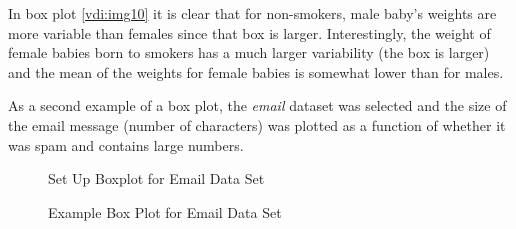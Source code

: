 In box plot \ref{vdi:img10} it is clear that for non-smokers, male baby's weights are more variable than females since that box is larger. Interestingly, the weight of female babies born to smokers has a much larger variability (the box is larger) and the mean of the weights for female babies is somewhat lower than for males.

As a second example of a box plot, the \textit{email} dataset was selected and the size of the email message (number of characters) was plotted as a function of whether it was spam and contains large numbers. 

\begin{figure}[H]
  \begin{center}
    \caption{Set Up Boxplot for Email Data Set}
  \end{center}
\end{figure}

\begin{figure}[H]
  \begin{center}
    \caption{Example Box Plot for Email Data Set}
    \label{vdi:img12}
  \end{center}
\end{figure}

